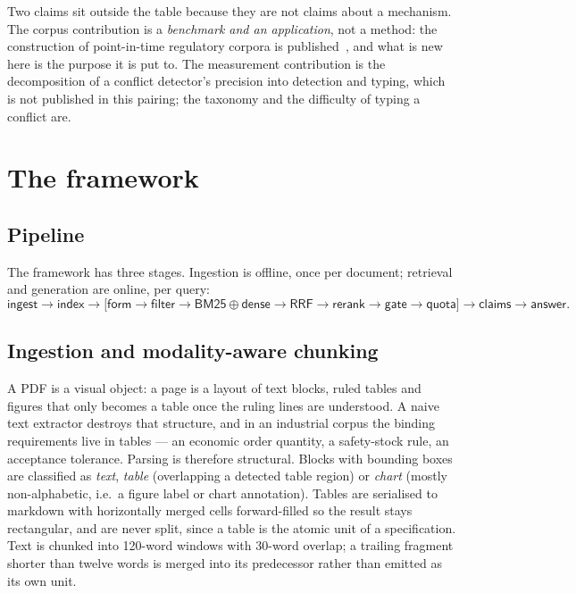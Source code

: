 \documentclass[preprint,3p,times]{elsarticle}
\begin{document}
Two claims sit outside the table because they are not claims about a
mechanism. The corpus contribution is a \emph{benchmark and an application},
not a method: the construction of point-in-time regulatory corpora is
published~\cite{akarajaradwong2026nitibench,prior2026oldfriend,huang2026wronglaw},
and what is new here is the purpose it is put to. The measurement
contribution is the decomposition of a conflict detector's precision into
detection and typing, which is not published in this pairing; the taxonomy
and the difficulty of typing a conflict are.

\section{The framework}

\subsection{Pipeline}

The framework has three stages. Ingestion is offline, once per document;
retrieval and generation are online, per query:
\begin{equation}
\textsf{ingest}\rightarrow\textsf{index}\rightarrow
\big[\textsf{form}\rightarrow\textsf{filter}\rightarrow
\textsf{BM25}\oplus\textsf{dense}\rightarrow
\textsf{RRF}\rightarrow\textsf{rerank}\rightarrow
\mathbf{\textsf{gate}}\rightarrow\textsf{quota}\big]\rightarrow
\textsf{claims}\rightarrow\textsf{answer}.
\end{equation}

\subsection{Ingestion and modality-aware chunking}

A PDF is a visual object: a page is a layout of text blocks, ruled tables and
figures that only becomes a table once the ruling lines are understood. A naive
text extractor destroys that structure, and in an industrial corpus the binding
requirements live in tables --- an economic order quantity, a safety-stock
rule, an acceptance tolerance. Parsing is therefore structural. Blocks with
bounding boxes are classified as \emph{text}, \emph{table} (overlapping a
detected table region) or \emph{chart} (mostly non-alphabetic, i.e.\ a figure
label or chart annotation). Tables are serialised to markdown with horizontally
merged cells forward-filled so the result stays rectangular, and are never split,
since a table is the atomic unit of a specification. Text is chunked into
120-word windows with 30-word overlap; a trailing fragment shorter than twelve
words is merged into its predecessor rather than emitted as its own unit.
\end{document}

